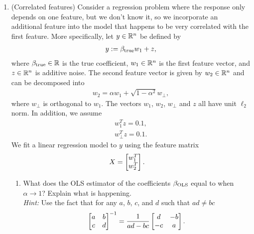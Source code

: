 \documentclass[12pt,twoside]{article}
\begin{document}
\begin{enumerate}
\item  (Correlated features) Consider a regression problem where the response only depends on one feature, but we don't know it, so we incorporate an additional feature into the model that happens to be very correlated with the first feature. More specifically, let $y \in \mathbb{R}^{n}$ be defined by
\begin{align}
y := \beta_{\operatorname{true}} w_1 + z, 
\end{align}
where $\beta_{\operatorname{true}} \in \mathbb{R}$ is the true coefficient, $w_1 \in \mathbb{R}^n$ is the first feature vector, and $z \in \mathbb{R}^{n}$ is additive noise. The second feature vector is given by $w_2\in \mathbb{R}^n$ and can be decomposed into
\begin{align}
w_2 = \alpha w_1 + \sqrt{1-\alpha^2} w_{\perp},
\end{align}  
where $w_{\perp}$ is orthogonal to $w_1$. The vectors $w_1$, $w_2$, $w_{\perp}$ and $z$ all have unit $\ell_2$ norm. In addition, we assume
\begin{align}
w_1^Tz = 0.1, \\
w_{\perp}^Tz = 0.1.
\end{align}
We fit a linear regression model to $y$ using the feature matrix 
  \begin{align}
  X & = \begin{bmatrix} w_1^T \\ w_2^T \end{bmatrix}.
  \end{align} 
 \begin{enumerate}
  \item What does the OLS estimator of the coefficients $\beta_{\operatorname{OLS}}$ equal to when $\alpha \rightarrow 1$? Explain what is happening. \\
\emph{Hint:} Use the fact that for any $a$, $b$, $c$, and $d$ such that $ad \neq bc$
\begin{align}
 \begin{bmatrix} a & b \\ c & d \end{bmatrix}^{-1} = \frac{1}{ad-bc} \begin{bmatrix} d & -b \\ -c & a \end{bmatrix}.
\end{align}\\

\medskip


\end{enumerate}
\end{enumerate}
\end{document}
